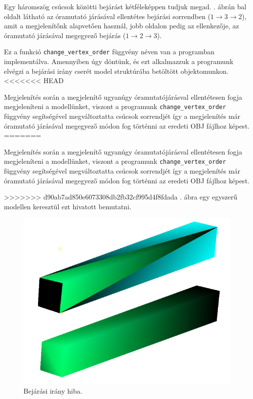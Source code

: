 Egy háromszög csúcsok közötti bejárást kétféleképpen tudjuk megad. . ábrán bal oldalt látható az óramutató járásával ellentétes bejárási sorrendben ($1 \rightarrow 3 \rightarrow 2$), amit a megjelenítőnk alapvetően használ, jobb oldalon pedig az ellenkezője, az óramutató járásával megegyező bejárás ($1 \rightarrow 2 \rightarrow 3$).

Ez a funkció \texttt{change\_vertex\_order} függvény néven van a programban implementálva. Amennyiben úgy döntünk, és ezt alkalmazzuk a programunk elvégzi a bejárási irány cserét model struktúrába betöltött objektomunkon.
<<<<<<< HEAD

Megjelenítés során a megjelenítő ugyanúgy óramutatójárásval ellentétesen fogja megjeleníteni a modellünket, viszont a programunk \texttt{change\_vertex\_order} függvény segítségével megváltoztatta csúcsok sorrendjét így a megjelenítés már óramutató járásával megegyező módon fog történni az eredeti OBJ fájlhoz képest.
\newpage
=======

Megjelenítés során a megjelenítő ugyanúgy óramutatójárásval ellentétesen fogja megjeleníteni a modellünket, viszont a programunk \texttt{change\_vertex\_order} függvény segítségével megváltoztatta csúcsok sorrendjét így a megjelenítés már óramutató járásával megegyező módon fog történni az eredeti OBJ fájlhoz képest.

>>>>>>> d90ab7ad850e6073308db2fb32cf995d4f8fdada
. ábra egy egyszerű modellen keresztül ezt hivatott bemutatni.

\begin{figure}[h]
\centering
\includegraphics[scale=0.5]{images/order.png}
\caption{Bejárási irány hiba.}
\label{fig:bej2}
\end{figure}

